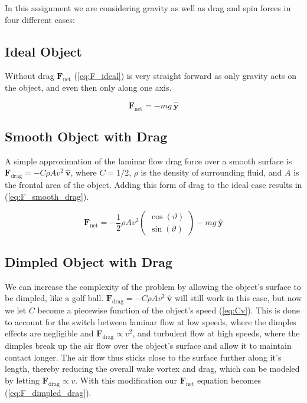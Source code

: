 \documentclass[notitlepage,aps,prd,nofootinbib]{revtex4-1}
\begin{document}
\clearpage

In this assignment we are considering gravity as well as drag and spin forces in four different cases:

\subsection{Ideal Object} \label{subsec:ideal}
Without drag $\mathbf{F}_{\text{net}}$ (\ref{eq:F_ideal}) is very straight forward as only gravity acts on the object, and even then only along one axis.

\begin{equation} \label{eq:F_ideal}
\mathbf{F}_{\text{net}} = -m g~\hat{\mathbf{y}}
\end{equation}

\subsection{Smooth Object with Drag} \label{subsec:smooth_drag}
A simple approximation of the laminar flow drag force over a smooth surface is $\mathbf{F}_{\text{drag}} = - C \rho A v^{2}~\hat{\mathbf{v}}$, where $C = 1/2$, $\rho$ is the density of surrounding fluid, and $A$ is the frontal area of the object. Adding this form of drag to the ideal case results in (\ref{eq:F_smooth_drag}).

\begin{equation} \label{eq:F_smooth_drag}
\mathbf{F}_{\text{net}} = - \frac{1}{2} \rho A v^{2} 
\begin{pmatrix}
  \cos(\vartheta) \\
  \sin(\vartheta)
\end{pmatrix}
-m g~\hat{\mathbf{y}}
\end{equation}


\subsection{Dimpled Object with Drag} \label{subsec:dimpled_drag}
We can increase the complexity of the problem by allowing the object's surface to be dimpled, like a golf ball. $\mathbf{F}_{\text{drag}} = - C \rho A v^{2}~\hat{\mathbf{v}}$ will still work in this case, but now we let $C$ become a piecewise function of the object's speed (\ref{eq:Cv}). This is done to account for the switch between laminar flow at low speeds, where the dimples effects are negligible and $\mathbf{F}_{\text{drag}} \propto v^{2}$, and turbulent flow at high speeds, where the dimples break up the air flow over the object's surface and allow it to maintain contact longer. The air flow thus sticks close to the surface further along it's length, thereby reducing the overall wake vortex and drag, which can be modeled by letting $\mathbf{F}_{\text{drag}} \propto v$. With this modification our $\mathbf{F}_{\text{net}}$ equation becomes (\ref{eq:F_dimpled_drag}).
\end{document}
